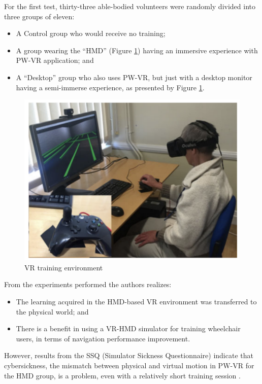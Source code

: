 For the first test, thirty-three able-bodied volunteers were randomly divided into three groups of eleven: 
\begin{itemize}
\item A Control group who would receive no training; 
\item A group wearing the ``HMD'' (Figure \ref{fig:john2018virtual}) having an immersive experience with PW-VR application; and
\item A ``Desktop'' group who also uses  PW-VR, but just with a desktop monitor having a semi-immerse experience, as presented by Figure \ref{fig:john2018virtual}.
\end{itemize}

\begin{figure}[!hbt]
\begin{center}
\includegraphics[width=0.95 \textwidth]{img/cap3/john2018virtual}
\caption{VR training environment \cite{john2018}}
\label{fig:john2018virtual}
\end{center}
\end{figure}

From the experiments performed the authors realizes: 
\begin{itemize}
\item The learning acquired in the HMD-based VR environment was transferred to the physical world; and 
\item There is a benefit in using a VR-HMD simulator for training wheelchair users, in terms of navigation performance improvement. 
\end{itemize}

However,  results from the SSQ (Simulator Sickness Questionnaire) indicate that cybersickness, the mismatch between physical and virtual motion in PW-VR for the HMD group, is a problem, even with a relatively short training session \cite{kennedy1993}.

